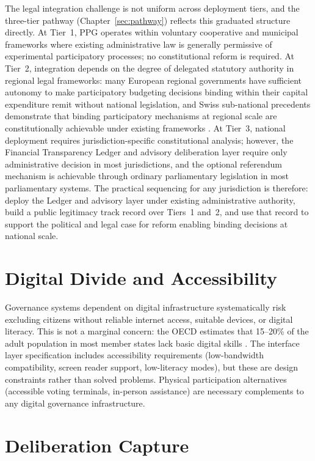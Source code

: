 \documentclass[12pt,a4paper,oneside]{report}
\begin{document}
The legal integration challenge is not uniform across deployment tiers, and the three-tier pathway (Chapter~\ref{sec:pathway}) reflects this graduated structure directly. At Tier~1, PPG operates within voluntary cooperative and municipal frameworks where existing administrative law is generally permissive of experimental participatory processes; no constitutional reform is required. At Tier~2, integration depends on the degree of delegated statutory authority in regional legal frameworks: many European regional governments have sufficient autonomy to make participatory budgeting decisions binding within their capital expenditure remit without national legislation, and Swiss sub-national precedents demonstrate that binding participatory mechanisms at regional scale are constitutionally achievable under existing frameworks \citep{linder2010swiss}. At Tier~3, national deployment requires jurisdiction-specific constitutional analysis; however, the Financial Transparency Ledger and advisory deliberation layer require only administrative decision in most jurisdictions, and the optional referendum mechanism is achievable through ordinary parliamentary legislation in most parliamentary systems. The practical sequencing for any jurisdiction is therefore: deploy the Ledger and advisory layer under existing administrative authority, build a public legitimacy track record over Tiers~1 and~2, and use that record to support the political and legal case for reform enabling binding decisions at national scale.

\section{Digital Divide and Accessibility}

Governance systems dependent on digital infrastructure systematically risk excluding citizens without reliable internet access, suitable devices, or digital literacy. This is not a marginal concern: the OECD estimates that 15--20\% of the adult population in most member states lack basic digital skills \citep{oecd2020open}. The interface layer specification includes accessibility requirements (low-bandwidth compatibility, screen reader support, low-literacy modes), but these are design constraints rather than solved problems. Physical participation alternatives (accessible voting terminals, in-person assistance) are necessary complements to any digital governance infrastructure.

\section{Deliberation Capture}
\end{document}

